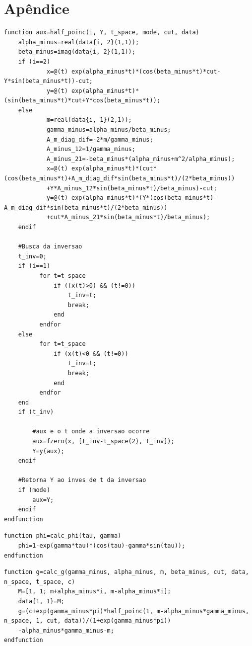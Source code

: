 \section{Apêndice}
\begin{lstlisting}[caption={C\'{a}lculo de $P^\pm$ ou $t^\pm$.}, captionpos=b]
function aux=half_poinc(i, Y, t_space, mode, cut, data)
    alpha_minus=real(data{i, 2}(1,1));
    beta_minus=imag(data{i, 2}(1,1));
    if (i==2)
            x=@(t) exp(alpha_minus*t)*(cos(beta_minus*t)*cut-Y*sin(beta_minus*t))-cut;
            y=@(t) exp(alpha_minus*t)*(sin(beta_minus*t)*cut+Y*cos(beta_minus*t));
    else
            m=real(data{i, 1}(2,1));           
            gamma_minus=alpha_minus/beta_minus;
            A_m_diag_dif=-2*m/gamma_minus;
            A_minus_12=1/gamma_minus;
            A_minus_21=-beta_minus*(alpha_minus+m^2/alpha_minus);
            x=@(t) exp(alpha_minus*t)*(cut*(cos(beta_minus*t)+A_m_diag_dif*sin(beta_minus*t)/(2*beta_minus))
            +Y*A_minus_12*sin(beta_minus*t)/beta_minus)-cut;
            y=@(t) exp(alpha_minus*t)*(Y*(cos(beta_minus*t)-A_m_diag_dif*sin(beta_minus*t)/(2*beta_minus))
            +cut*A_minus_21*sin(beta_minus*t)/beta_minus);
    endif
    
    #Busca da inversao
    t_inv=0;
    if (i==1)      
          for t=t_space
              if ((x(t)>0) && (t!=0))
                  t_inv=t;
                  break;
              end
          endfor
    else
          for t=t_space
              if (x(t)<0 && (t!=0))
                  t_inv=t;
                  break;
              end
          endfor
    end
    if (t_inv)
      
        #aux e o t onde a inversao ocorre
        aux=fzero(x, [t_inv-t_space(2), t_inv]);
        Y=y(aux);
    endif
    
    #Retorna Y ao inves de t da inversao
    if (mode)
        aux=Y;
    endif
endfunction
\end{lstlisting}
\begin{lstlisting}[caption={C\'{a}lculo de $\varphi_\gamma(\tau)$.}, captionpos=b]
function phi=calc_phi(tau, gamma)
    phi=1-exp(gamma*tau)*(cos(tau)-gamma*sin(tau));
endfunction
\end{lstlisting}
\begin{lstlisting}[caption={C\'{a}lculo de $g(m^-)$.}, captionpos=b]
function g=calc_g(gamma_minus, alpha_minus, m, beta_minus, cut, data, n_space, t_space, c)
    M=[1, 1; m+alpha_minus*i, m-alpha_minus*i];
    data{1, 1}=M;
    g=(c+exp(gamma_minus*pi)*half_poinc(1, m-alpha_minus*gamma_minus, n_space, 1, cut, data))/(1+exp(gamma_minus*pi))
    -alpha_minus*gamma_minus-m;
endfunction
\end{lstlisting}

